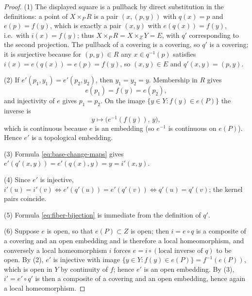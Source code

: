 \documentclass[11pt,reqno]{amsart}
\theoremstyle{definition}
\theoremstyle{remark}
\begin{document}
\begin{proof}
(1)  The displayed square is a pullback by direct substitution in the definitions: a point of \(X\times_PR\) is a pair \((x,(p,y))\) with \(q(x)=p\) and \(e(p)=f(y)\), which is exactly a pair \((x,y)\) with \(e(q(x))=f(y)\), i.e.\ with \(i(x)=f(y)\); thus \(X\times_PR=X\times_ZY=E\), with \(q'\) corresponding to the second projection.  The pullback of a covering is a covering, so \(q'\) is a covering; it is surjective because for \((p,y)\in R\) any \(x\in q^{-1}(p)\) satisfies \(i(x)=e(q(x))=e(p)=f(y)\), so \((x,y)\in E\) and \(q'(x,y)=(p,y)\).

(2)  If \(e'(p_1,y_1)=e'(p_2,y_2)\), then \(y_1=y_2=y\).  Membership in \(R\) gives
\[
e(p_1)=f(y)=e(p_2),
\]
and injectivity of \(e\) gives \(p_1=p_2\).  On the image \(\{y\in Y:f(y)\in e(P)\}\) the inverse is
\[
y\longmapsto\bigl(e^{-1}(f(y)),\,y\bigr),
\]
which is continuous because \(e\) is an embedding (so \(e^{-1}\) is continuous on \(e(P)\)).  Hence \(e'\) is a topological embedding.

(3)  Formula \eqref{eq:base-change-maps} gives \(e'(q'(x,y))=e'(q(x),y)=y=i'(x,y)\).

(4)  Since \(e'\) is injective, \(i'(u)=i'(v)\iff e'(q'(u))=e'(q'(v))\iff q'(u)=q'(v)\); the kernel pairs coincide.

(5)  Formula \eqref{eq:fiber-bijection} is immediate from the definition of \(q'\).

(6)  Suppose \(e\) is open, so that \(e(P)\subset Z\) is open; then \(i=e\circ q\) is a composite of a covering and an open embedding and is therefore a local homeomorphism, and conversely a local homeomorphism \(i\) forces \(e=i\circ(\text{local inverse of }q)\) to be open.  By (2), \(e'\) is injective with image \(\{y\in Y:f(y)\in e(P)\}=f^{-1}(e(P))\), which is open in \(Y\) by continuity of \(f\); hence \(e'\) is an open embedding.  By (3), \(i'=e'\circ q'\) is then a composite of a covering and an open embedding, hence again a local homeomorphism.
\end{proof}
\end{document}
